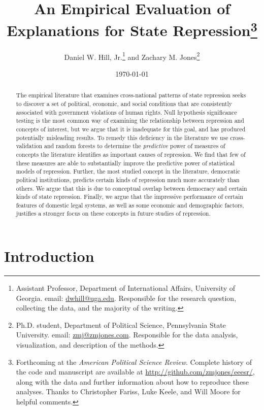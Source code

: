 \documentclass[11pt]{article}
\date{\today}
\title{An Empirical Evaluation of Explanations for State Repression\thanks{Forthcoming at the {\it American Political Science Review}. Complete history of the code and manuscript are available at \url{http://github.com/zmjones/eeesr/}, along with the data and further information about how to reproduce these analyses. Thanks to Christopher Fariss, Luke Keele, and Will Moore for helpful comments.}}
\author{Daniel W. Hill, Jr.\thanks{Assistant Professor, Department of International Affairs,
University of Georgia. email: \href{mailto:dwhill@uga.edu}{dwhill@uga.edu}. Responsible for the research question, collecting the data, and the majority of the writing.} and Zachary M. Jones\thanks{Ph.D. student, Department of Political Science, Pennsylvania State University. email: \href{mailto:zmj@zmjones.com}{zmj@zmjones.com}. Responsible for the data analysis, visualization, and description of the methods.}}
\begin{document}
\maketitle 


\begin{abstract}
The empirical literature that examines cross-national patterns of state repression seeks to discover a set of political, economic, and social conditions that are consistently associated with government violations of human rights. Null hypothesis significance testing is the most common way of examining the relationship  between repression and concepts of interest, but we argue that it is inadequate for this goal, and has produced potentially misleading results. To remedy this deficiency in the literature we use cross-validation and random forests to determine the {\em predictive} power of measures of concepts the literature identifies as important causes of repression. We find that few of these measures are able to substantially improve the predictive power of statistical models of repression. Further, the most studied concept in the literature, democratic political institutions, predicts certain kinds of repression much more accurately than others. We argue that this is due to conceptual overlap between democracy and certain kinds of state repression. Finally, we argue that the impressive performance of certain features of domestic legal systems, as well as some economic and demographic factors, justifies a stronger focus on these concepts in future studies of repression.
\end{abstract}

\clearpage
\setcounter{page}{1}

\section{Introduction}
\end{document}
